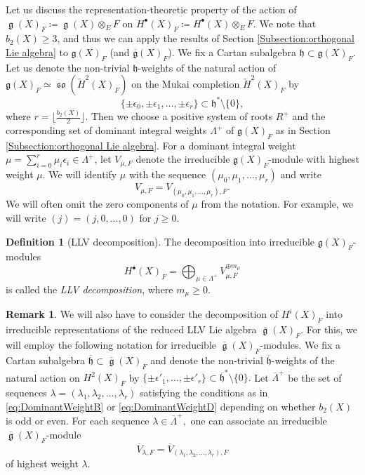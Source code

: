 \documentclass[12pt,reqno]{amsart}
\theoremstyle{definition}
\newtheorem{rem}[thm]{Remark}
\newtheorem{defn}[thm]{Definition}
\renewcommand\ge{\mathop{\mathfrak{g}}\nolimits}
\newcommand\so{\mathop{\mathfrak{so}}\nolimits}
\newcommand{\frh}{\mathfrak{h}}
\newcommand{\frg}{\mathfrak{g}}
\newcommand{\fg}{\mathfrak{g}}
\numberwithin{equation}{section}
\begin{document}
Let us discuss the representation-theoretic property of the action of $\ge(X)_F\coloneqq \ge(X) \otimes_E F$ on
$H^{\bullet}(X)_F\coloneqq H^{\bullet}(X) \otimes_E F$.
{We note that $b_2(X) \geq 3$, and thus we can apply the results of Section \ref{Subsection:orthogonal Lie algebra} to $\fg(X)_{F}$ (and $\overline{\fg}(X)_{F}$).}
We fix a Cartan subalgebra $\frh \subset \fg(X)_{F}$.
Let us denote the non-trivial $\frh$-weights of the natural action of $\frg(X)_F \simeq \so(\widetilde{H}^2 (X)_F)$ on the Mukai completion
$\widetilde{H}^2 (X)_F$ by
\[
\{ \pm \epsilon_0, \pm \epsilon_1, \ldots, \pm \epsilon_r \} \subset \frh^*\setminus \{0 \},
\]
where $r = \lfloor \frac{b_2(X)}{2} \rfloor$.
Then we choose a positive system of roots $R^+$ and the corresponding set of dominant integral weights $\Lambda^+$ of $\frg(X)_F$ as in Section \ref{Subsection:orthogonal Lie algebra}.
For a dominant integral weight $\mu =\sum_{i=0}^{r} \mu_i \epsilon_i \in \Lambda^+$,
let $V_{\mu, F}$ denote the irreducible $\frg(X)_F$-module with highest weight $\mu$.
We will identify $\mu$ with the sequence
$(\mu_0, \mu_1, \dotsc, \mu_r)$
and write
\[
V_{\mu,F}=V_{(\mu_0, \mu_1, \dotsc, \mu_r),F}.
\]
We will often omit the zero components of $\mu$ from the notation.
For example, we will write $(j)=(j, 0, \dotsc, 0)$ for $j \geq 0$.

\begin{defn}[LLV decomposition]\label{def:LLVdecomposition betti etale p-adic}
    The decomposition into irreducible $\frg(X)_F$-modules
    \[
    H^\bullet(X)_F = \bigoplus_{\mu \in \Lambda^+}V^{\oplus m_{\mu}}_{\mu,F}
    \]
    is called the \emph{LLV decomposition}, where $m_{\mu} \geq 0$.
\end{defn}



\begin{rem}\label{Remark:reduced LLV irreducible components}
We will also have to consider
the decomposition
of $H^i(X)_F$
into
irreducible
representations of the reduced LLV Lie algebra $\overline{\ge}(X)_F$.
For this, we will employ the following notation for irreducible $\overline{\ge}(X)_F$-modules.
    We fix a Cartan subalgebra
    $\overline{\frh} \subset \overline{\ge}(X)_F$
    and denote the non-trivial $\overline{\frh}$-weights of the natural action on
    $H^2(X)_F$ by
$
\{ \pm \epsilon'_1, \ldots, \pm \epsilon'_{r} \} \subset \overline{\frh}^*\setminus \{0 \}.
$
Let 
$\overline{\Lambda}^+$
be the set of sequences
$
\lambda=(\lambda_1, \lambda_2, \dotsc, \lambda_{r})
$
satisfying the conditions as in \eqref{eq:DominantWeightB} or \eqref{eq:DominantWeightD} depending on whether $b_2(X)$ is odd or even.
For each sequence
$
\lambda \in \overline{\Lambda}^+,
$
one can associate
an irreducible
$\overline{\ge}(X)_F$-module
\[
\overline{V}_{\lambda, F}=\overline{V}_{(\lambda_1, \lambda_2, \dotsc, \lambda_{r}), F}
\]
of highest weight $\lambda$.
\end{rem}
\end{document}
